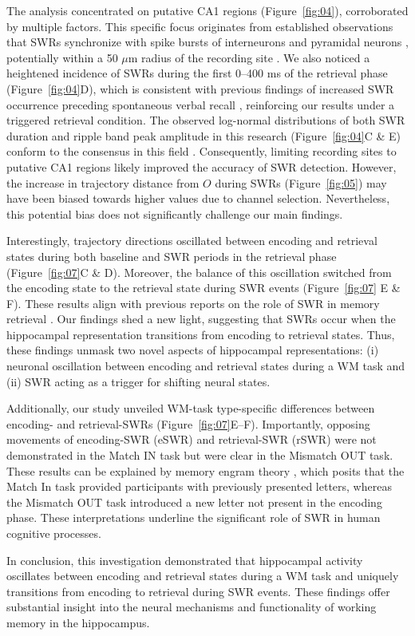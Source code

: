 The analysis concentrated on putative CA1 regions (Figure~\ref{fig:04}), corroborated by multiple factors. This specific focus originates from established observations that SWRs synchronize with spike bursts of interneurons and pyramidal neurons \cite{buzsaki_two-stage_1989} \cite{quyen_cell_2008} \cite{royer_control_2012} \cite{hajos_input-output_2013}, potentially within a 50 $\mu$m radius of the recording site \cite{schomburg_spiking_2012}. We also noticed a heightened incidence of SWRs during the first 0--400 ms of the retrieval phase (Figure~\ref{fig:04}D), which is consistent with previous findings of increased SWR occurrence preceding spontaneous verbal recall \cite{norman_hippocampal_2019} \cite{norman_hippocampal_2021}, reinforcing our results under a triggered retrieval condition. The observed log-normal distributions of both SWR duration and ripple band peak amplitude in this research (Figure~\ref{fig:04}C \& E) conform to the consensus in this field \cite{liu_consensus_2022}. Consequently, limiting recording sites to putative CA1 regions likely improved the accuracy of SWR detection. However, the increase in trajectory distance from $O$ during SWRs (Figure~\ref{fig:05}) may have been biased towards higher values due to channel selection. Nevertheless, this potential bias does not significantly challenge our main findings.

Interestingly, trajectory directions oscillated between encoding and retrieval states during both baseline and SWR periods in the retrieval phase (Figure~\ref{fig:07}C \& D). Moreover, the balance of this oscillation switched from the encoding state to the retrieval state during SWR events (Figure~\ref{fig:07} E \& F). These results align with previous reports on the role of SWR in memory retrieval \cite{norman_hippocampal_2019} \cite{norman_hippocampal_2021}. Our findings shed a new light, suggesting that SWRs occur when the hippocampal representation transitions from encoding to retrieval states. Thus, these findings unmask two novel aspects of hippocampal representations: (i) neuronal oscillation between encoding and retrieval states during a WM task and (ii) SWR acting as a trigger for shifting neural states.

Additionally, our study unveiled WM-task type-specific differences between encoding- and retrieval-SWRs (Figure~\ref{fig:07}E--F). Importantly, opposing movements of encoding-SWR (eSWR) and retrieval-SWR (rSWR) were not demonstrated in the Match IN task but were clear in the Mismatch OUT task. These results can be explained by memory engram theory \cite{liu_optogenetic_2012}, which posits that the Match In task provided participants with previously presented letters, whereas the Mismatch OUT task introduced a new letter not present in the encoding phase. These interpretations underline the significant role of SWR in human cognitive processes.

In conclusion, this investigation demonstrated that hippocampal activity oscillates between encoding and retrieval states during a WM task and uniquely transitions from encoding to retrieval during SWR events. These findings offer substantial insight into the neural mechanisms and functionality of working memory in the hippocampus.
\label{sec:discussion}
